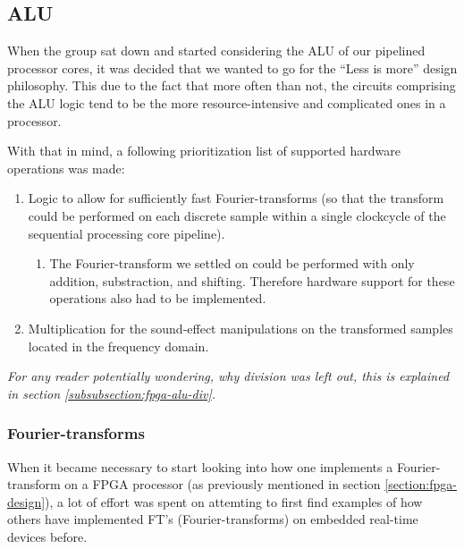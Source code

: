 \FloatBarrier
\subsection{ALU}\label{subsection:fpga-alu}

When the group sat down and started considering the ALU of our pipelined
processor cores, it was decided that we wanted to go for the ``Less is more''
design philosophy. This due to the fact that more often than not, the circuits
comprising the ALU logic tend to be the more resource-intensive and complicated
ones in a processor.

With that in mind, a following prioritization list of supported hardware
operations was made:
\begin{enumerate}
	\item Logic to allow for sufficiently fast Fourier-transforms (so that the
transform could be performed on each discrete sample within a single clockcycle
of the sequential processing core pipeline).
	\begin{enumerate}
		\item The Fourier-transform we settled on could be performed with only
addition, substraction, and shifting. Therefore hardware support for these
operations also had to be implemented.
	\end{enumerate}
	\item Multiplication for the sound-effect manipulations on the transformed
samples located in the frequency domain.
\end{enumerate}
\emph{For any reader potentially wondering, why division was left out, this is
explained in section \ref{subsubsection:fpga-alu-div}.}

\FloatBarrier
\subsubsection{Fourier-transforms}\label{subsubsection:fpga-alu-ft}

When it became necessary to start looking into how one implements a
Fourier-transform on a FPGA processor (as previously mentioned in section
\ref{section:fpga-design}), a lot of effort was spent on attemting to first find
examples of how others have implemented FT's (Fourier-transforms) on embedded
real-time devices before.

